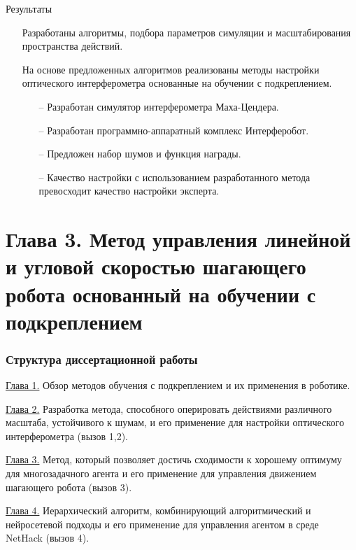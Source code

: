\begin{frame}{Результаты}
\begin{itemize}
    \item[\textcolor{ForestGreen}{\checkmark}] Разработаны алгоритмы, подбора параметров симуляции и масштабирования пространства действий. 
    \item[\textcolor{ForestGreen}{\checkmark}] На основе предложенных алгоритмов реализованы методы настройки оптического интерферометра основанные на обучении с подкреплением.
    \begin{itemize}
        \item[--] Разработан симулятор интерферометра Маха-Цендера.
        \item[--] Разработан программно-аппаратный комплекс Интерферобот.
        \item[--] Предложен набор шумов и функция награды.
        \item[--] Качество настройки с использованием разработанного метода превосходит качество настройки эксперта.
    \end{itemize}
    
    
\end{itemize}
    



\end{frame}



\section{Глава 3. Метод управления линейной и угловой скоростью шагающего робота основанный на обучении с подкреплением}

\begin{frame}
    \frametitle{Структура диссертационной работы}
    \begin{itemize}
        \item \underline{Глава 1.} Обзор методов обучения с подкреплением и их применения в роботике. 
        \item \underline{Глава 2.} Разработка метода, способного оперировать действиями различного масштаба, устойчивого к шумам, и его применение для настройки оптического интерферометра (вызов 1,2).
        {\color{orange}\item \underline{Глава 3.} Метод, который позволяет достичь сходимости к хорошему оптимуму для многозадачного агента и его применение  для управления движением шагающего робота (вызов 3).}
        \item \underline{Глава 4.} Иерархический алгоритм, комбинирующий алгоритмический и нейросетевой подходы и его применение для управления агентом в среде NetHack (вызов 4).
    \end{itemize}
\end{frame}

